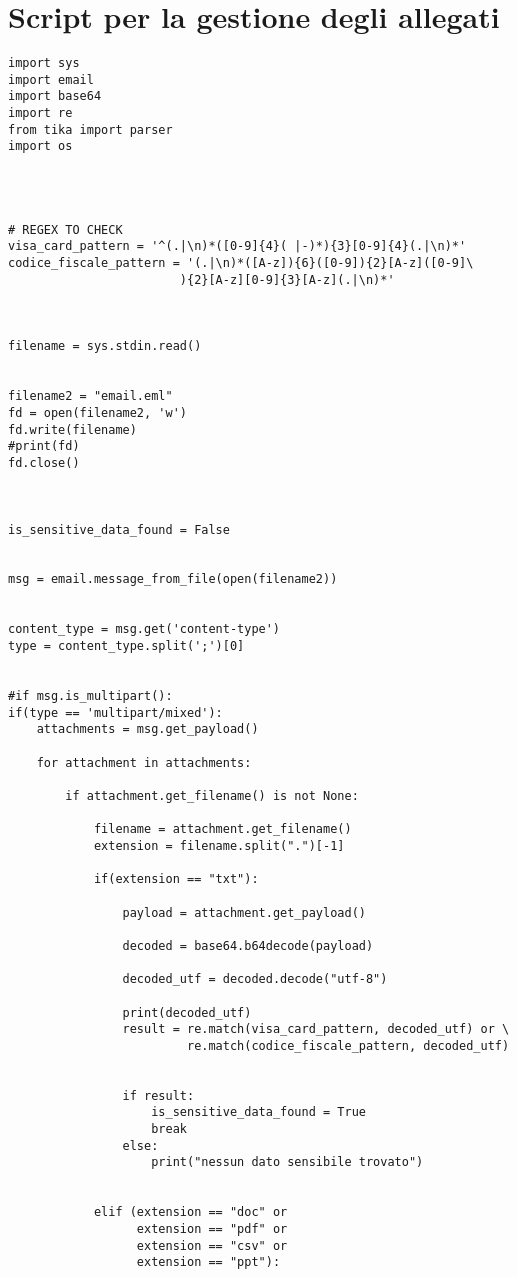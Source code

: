 \chapter{Script per la gestione degli allegati}

\begin{verbatim}
import sys
import email
import base64
import re
from tika import parser
import os




# REGEX TO CHECK
visa_card_pattern = '^(.|\n)*([0-9]{4}( |-)*){3}[0-9]{4}(.|\n)*'
codice_fiscale_pattern = '(.|\n)*([A-z]){6}([0-9]){2}[A-z]([0-9]\
                        ){2}[A-z][0-9]{3}[A-z](.|\n)*'



filename = sys.stdin.read()


filename2 = "email.eml"
fd = open(filename2, 'w')
fd.write(filename)
#print(fd)
fd.close()



is_sensitive_data_found = False


msg = email.message_from_file(open(filename2))


content_type = msg.get('content-type')
type = content_type.split(';')[0]


#if msg.is_multipart():
if(type == 'multipart/mixed'):
    attachments = msg.get_payload()

    for attachment in attachments:

        if attachment.get_filename() is not None:
           
            filename = attachment.get_filename()
            extension = filename.split(".")[-1]

            if(extension == "txt"):

                payload = attachment.get_payload()

                decoded = base64.b64decode(payload)

                decoded_utf = decoded.decode("utf-8")

                print(decoded_utf)
                result = re.match(visa_card_pattern, decoded_utf) or \
                         re.match(codice_fiscale_pattern, decoded_utf)
                

                if result:
                    is_sensitive_data_found = True
                    break
                else:
                    print("nessun dato sensibile trovato")


            elif (extension == "doc" or
                  extension == "pdf" or
                  extension == "csv" or
                  extension == "ppt"):



\end{verbatim}
